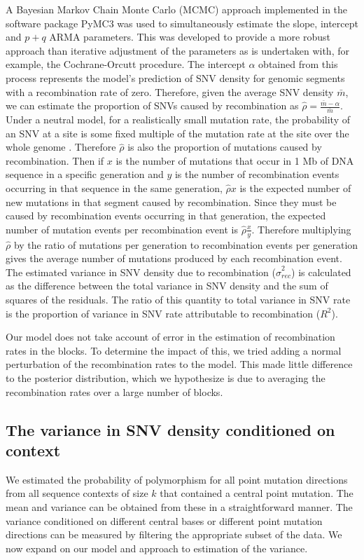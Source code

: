 A Bayesian Markov Chain Monte Carlo (MCMC) approach implemented in the software package PyMC3 \citep{salvatier2016probabilistic} was used to simultaneously estimate the slope, intercept and $p+q$ ARMA parameters. This was developed to provide a more robust approach than iterative adjustment of the parameters \citep{mizon1995simple} as is undertaken with, for example, the Cochrane-Orcutt procedure. The intercept $\alpha$ obtained from this process represents the model's prediction of SNV density for genomic segments with a recombination rate of zero. Therefore, given the average SNV density $\bar m$, we can estimate the proportion of SNVs caused by recombination as $\hat{\rho } =\frac{\bar m-\alpha}{\bar m}$. Under a neutral model, for a realistically small mutation rate, the probability of an SNV at a site is some fixed multiple of the mutation rate at the site over the whole genome \citep{Hodgkinson2009}. Therefore $\hat{\rho }$ is also the proportion of mutations caused by recombination. Then if $x$ is the number of mutations that occur in 1 Mb of DNA sequence in a specific generation and $y$ is the number of recombination events occurring in that sequence in the same generation, $\hat{\rho } x$ is the expected number of new mutations in that segment caused by recombination. Since they must be caused by recombination events occurring in that generation, the expected number of mutation events per recombination event is $\hat{\rho }\frac{x}{y}$. Therefore multiplying $\hat{\rho }$ by the ratio of mutations per generation to recombination events per generation gives the average number of mutations produced by each recombination event. The estimated variance in SNV density due to recombination ($\hat{\sigma }^2_{rec}$) is calculated as the difference between the total variance in SNV density and the sum of squares of the residuals. The ratio of this quantity to total variance in SNV rate is the proportion of variance in SNV rate attributable to recombination ($R^2$).

Our model does not take account of error in the estimation of recombination rates in the blocks. To determine the impact of this, we tried adding a normal perturbation of the recombination rates to the model. This made little difference to the posterior distribution, which we hypothesize is due to averaging the recombination rates over a large number of blocks.

\subsection*{The variance in SNV density conditioned on context} \label{the-variance-in-probability-of-polymorphism}
We estimated the probability of polymorphism for all point mutation directions from all sequence contexts of size $k$ that contained a central point mutation. The mean and variance can be obtained from these in a straightforward manner. The variance conditioned on different central bases or different point mutation directions can be measured by filtering the appropriate subset of the data. We now expand on our model and approach to estimation of the variance.

